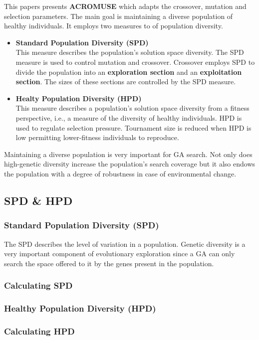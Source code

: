 \documentclass[../main.tex]{subfiles}
\begin{document}
This papers presents \textbf{ACROMUSE} which adapts the crossover, mutation and selection parameters. The main goal is maintaining a diverse population of healthy individuals. It employs two measures to of population diversity.

\begin{itemize}
	\item \textbf{Standard Population Diversity (SPD)} \\
	This measure describes the population's solution space diversity. The SPD measure is used to control mutation and crossover. Crossover employs SPD to divide the population into an \textbf{exploration section} and an \textbf{exploitation section}. The sizes of these sections are controlled by the SPD measure.
	\item \textbf{Healty Population Diversity (HPD)} \\
	This measure describes a population’s solution space diversity from a fitness perspective, i.e., a measure of the
	diversity of healthy individuals. HPD is used to regulate selection pressure. Tournament size is reduced when HPD is low permitting lower-fitness individuals to reproduce.
\end{itemize}

Maintaining a diverse population is very important for GA search. Not only does high-genetic diversity increase the
population's search coverage but it also endows the population with a degree of robustness in case of environmental change.

\subsection{SPD \& HPD}

\subsubsection{Standard Population Diversity (SPD)}
The SPD describes the level of variation in a population. Genetic diversity is a very important component of
evolutionary exploration since a GA can only search the space offered to it by the genes present in the population.

\subsubsection{Calculating SPD}
\subsubsection{Healthy Population Diversity (HPD)}
\subsubsection{Calculating HPD}
\end{document}
